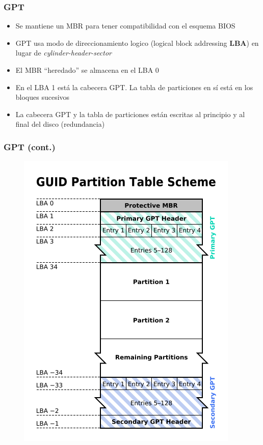 \begin{frame}
	\frametitle{GPT}
	\begin{itemize}
		\item Se mantiene un MBR para tener compatibilidad con el esquema BIOS
		\item GPT usa modo de direccionamiento logico (logical block addressing \textbf{LBA}) en lugar de \textit{cylinder-header-sector}
		\item El MBR ``heredado'' se almacena en el LBA 0
		\item En el LBA 1 está la cabecera GPT. La tabla de particiones en sí está en los bloques sucesivos
		\item La cabecera GPT y la tabla de particiones están escritas al principio y al final del disco (redundancia)
	\end{itemize}
\end{frame}

\begin{frame}[fragile]
	\frametitle{GPT (cont.)}
	\begin{figure}
		\centering
		\includegraphics[scale=0.3]{images/gpt.png}
	\end{figure}
\end{frame}


